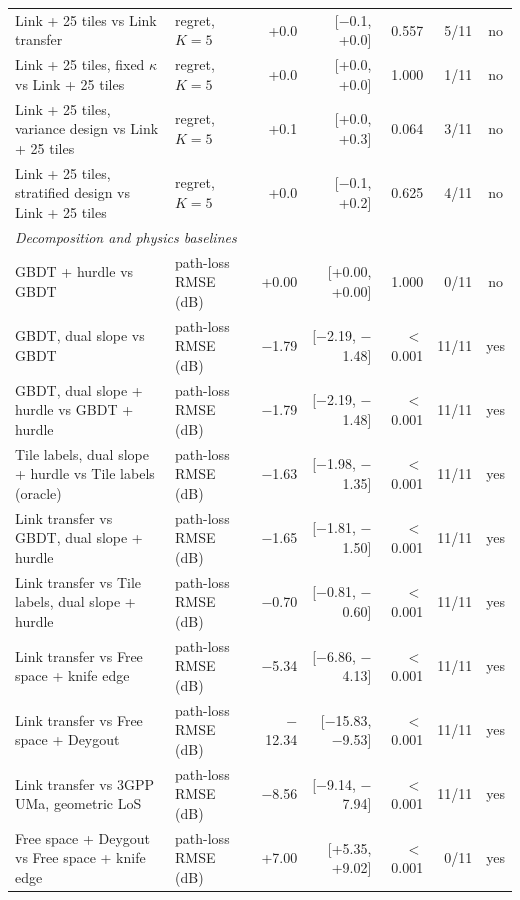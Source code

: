 \begin{tabular}{llrrrrc}
Link + 25 tiles vs Link transfer & regret, $K{=}5$ & +0.0 & [\ensuremath{-}0.1, +0.0] & 0.557 & 5/11 & no \\
Link + 25 tiles, fixed $\kappa$ vs Link + 25 tiles & regret, $K{=}5$ & +0.0 & [+0.0, +0.0] & 1.000 & 1/11 & no \\
Link + 25 tiles, variance design vs Link + 25 tiles & regret, $K{=}5$ & +0.1 & [+0.0, +0.3] & 0.064 & 3/11 & no \\
Link + 25 tiles, stratified design vs Link + 25 tiles & regret, $K{=}5$ & +0.0 & [\ensuremath{-}0.1, +0.2] & 0.625 & 4/11 & no \\
\multicolumn{7}{l}{\emph{Decomposition and physics baselines}} \\
GBDT + hurdle vs GBDT & path-loss RMSE (dB) & +0.00 & [+0.00, +0.00] & 1.000 & 0/11 & no \\
GBDT, dual slope vs GBDT & path-loss RMSE (dB) & \ensuremath{-}1.79 & [\ensuremath{-}2.19, \ensuremath{-}1.48] & $<$0.001 & 11/11 & yes \\
GBDT, dual slope + hurdle vs GBDT + hurdle & path-loss RMSE (dB) & \ensuremath{-}1.79 & [\ensuremath{-}2.19, \ensuremath{-}1.48] & $<$0.001 & 11/11 & yes \\
Tile labels, dual slope + hurdle vs Tile labels (oracle) & path-loss RMSE (dB) & \ensuremath{-}1.63 & [\ensuremath{-}1.98, \ensuremath{-}1.35] & $<$0.001 & 11/11 & yes \\
Link transfer vs GBDT, dual slope + hurdle & path-loss RMSE (dB) & \ensuremath{-}1.65 & [\ensuremath{-}1.81, \ensuremath{-}1.50] & $<$0.001 & 11/11 & yes \\
Link transfer vs Tile labels, dual slope + hurdle & path-loss RMSE (dB) & \ensuremath{-}0.70 & [\ensuremath{-}0.81, \ensuremath{-}0.60] & $<$0.001 & 11/11 & yes \\
Link transfer vs Free space + knife edge & path-loss RMSE (dB) & \ensuremath{-}5.34 & [\ensuremath{-}6.86, \ensuremath{-}4.13] & $<$0.001 & 11/11 & yes \\
Link transfer vs Free space + Deygout & path-loss RMSE (dB) & \ensuremath{-}12.34 & [\ensuremath{-}15.83, \ensuremath{-}9.53] & $<$0.001 & 11/11 & yes \\
Link transfer vs 3GPP UMa, geometric LoS & path-loss RMSE (dB) & \ensuremath{-}8.56 & [\ensuremath{-}9.14, \ensuremath{-}7.94] & $<$0.001 & 11/11 & yes \\
Free space + Deygout vs Free space + knife edge & path-loss RMSE (dB) & +7.00 & [+5.35, +9.02] & $<$0.001 & 0/11 & yes \\

\end{tabular}

